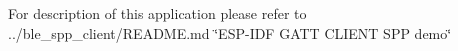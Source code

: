 For description of this application please refer to ../ble\+\_\+spp\+\_\+client/\+R\+E\+A\+D\+ME.md \char`\"{}\+E\+S\+P-\/\+I\+D\+F G\+A\+T\+T C\+L\+I\+E\+N\+T S\+P\+P demo\char`\"{} 